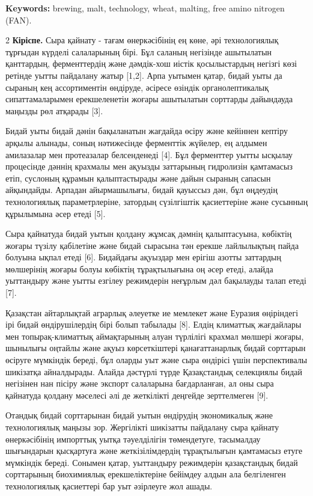 {\bfseries Keywords:} brewing, malt, technology, wheat, malting, free amino
nitrogen (FAN).

\begin{multicols}{2}
{\bfseries Кіріспе.} Сыра қайнату - тағам өнеркәсібінің ең көне, әрі
технологиялық тұрғыдан күрделі салаларының бірі. Бұл саланың негізінде
ашытылатын қанттардың, ферменттердің және дәмдік-хош иістік
қосылыстардың негізгі көзі ретінде уытты пайдалану жатыр {[}1,2{]}. Арпа
уытымен қатар, бидай уыты да сыраның кең ассортиментін өндіруде, әсіресе
өзіндік органолептикалық сипаттамаларымен ерекшеленетін жоғары
ашытылатын сорттарды дайындауда маңызды рөл атқарады {[}3{]}.

Бидай уыты бидай дәнін бақыланатын жағдайда өсіру және кейіннен кептіру
арқылы алынады, соның нәтижесінде ферменттік жүйелер, ең алдымен
амилазалар мен протеазалар белсенденеді {[}4{]}. Бұл ферменттер уытты
ысқылау процесінде дәннің крахмалы мен ақуызды заттарының гидролизін
қамтамасыз етіп, суслоның құрамын қалыптастырады және дайын сыраның
сапасын айқындайды. Арпадан айырмашылығы, бидай қауыссыз дән, бұл
өңдеудің технологиялық параметрлеріне, затордың сүзілгіштік қасиеттеріне
және сусынның құрылымына әсер етеді {[}5{]}.

Сыра қайнатуда бидай уытын қолдану жұмсақ дәмнің қалыптасуына, көбіктің
жоғары түзілу қабілетіне және бидай сырасына тән ерекше лайлылықтың
пайда болуына ықпал етеді {[}6{]}. Бидайдағы ақуыздар мен ерігіш азотты
заттардың мөлшерінің жоғары болуы көбіктің тұрақтылығына оң әсер етеді,
алайда уыттандыру және уытты езгілеу режимдерін неғұрлым дәл бақылауды
талап етеді {[}7{]}.

Қазақстан айтарлықтай аграрлық әлеуетке ие мемлекет және Еуразия
өңіріндегі ірі бидай өндірушілердің бірі болып табылады {[}8{]}. Елдің
климаттық жағдайлары мен топырақ-климаттық аймақтарының алуан түрлілігі
крахмал мөлшері жоғары, шынылығы оңтайлы және ақуыз көрсеткіштері
қанағаттанарлық бидай сорттарын өсіруге мүмкіндік береді, бұл оларды уыт
және сыра өндірісі үшін перспективалы шикізатқа айналдырады. Алайда
дәстүрлі түрде Қазақстандық селекциялы бидай негізінен нан пісіру және
экспорт салаларына бағдарланған, ал оны сыра қайнатуда қолдану мәселесі
әлі де жеткілікті деңгейде зерттелмеген {[}9{]}.

Отандық бидай сорттарынан бидай уытын өндірудің экономикалық және
технологиялық маңызы зор. Жергілікті шикізатты пайдалану сыра қайнату
өнеркәсібінің импорттық уытқа тәуелділігін төмендетуге, тасымалдау
шығындарын қысқартуға және жеткізілімдердің тұрақтылығын қамтамасыз
етуге мүмкіндік береді. Сонымен қатар, уыттандыру режимдерін
қазақстандық бидай сорттарының биохимиялық ерекшеліктеріне бейімдеу
алдын ала белгіленген технологиялық қасиеттері бар уыт әзірлеуге жол
ашады.


\end{multicols}
